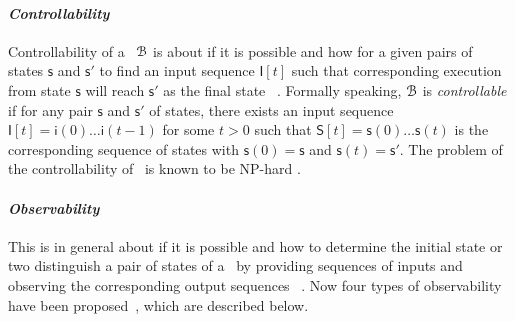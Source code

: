 
\paragraph*{\em Controllability}  Controllability of a  \BCN\ ${\mathcal{B}}$  is  about if it is possible and how for a given pairs of states $\mathsf{s}$ and $\mathsf{s}'$  to find an input  sequence $\mathsf{I}[t]$  such that  corresponding execution from state $\mathsf{s}$ will reach $\mathsf{s}'$ as the final state ~\cite{Akutsu2007Control}. Formally speaking, ${\mathcal{B}}$ is {\em controllable} 
if for any pair $\mathsf{s}$ and $\mathsf{s}'$ of states, there  exists an input sequence $\mathsf{I}[t]=\mathsf{i}(0)\ldots\mathsf{i}(t-1)$ for some $t>0$ such that $\mathsf{S}[t]=\mathsf{s}(0)\ldots\mathsf{s}(t)$ is the corresponding sequence of states with $\mathsf{s}(0) =\mathsf{s}$ and $\mathsf{s}(t)=\mathsf{s}'$. The  problem of the controllability of \BCNs\ is known to be {NP}-hard \cite{Akutsu2007Control}. %
%

\paragraph*{\em Observability} This is in general about if it is possible and how to determine the initial state or two distinguish a pair of states of a \BCN\   by providing sequences of inputs and observing the corresponding output sequences ~\cite{cheng2009controllability}. Now four types of observability have been proposed~\cite{Zhang2016Observability}, which are described below.


